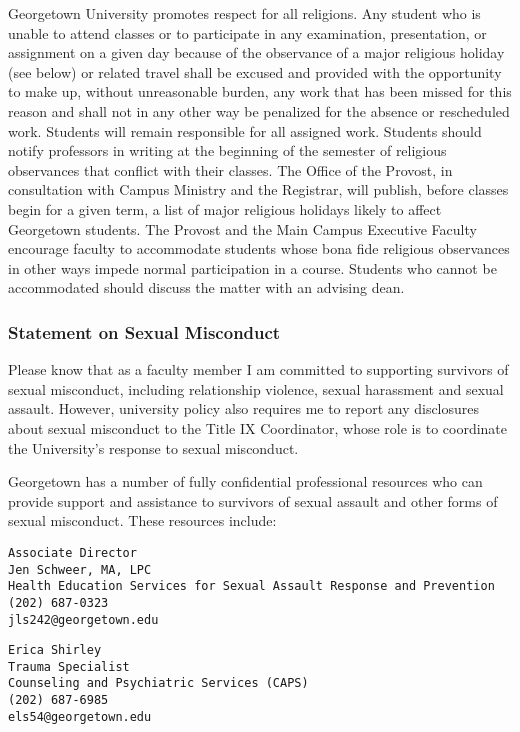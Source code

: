 \documentclass[
  12pt,
]{article}
\begin{document}
Georgetown University promotes respect for all religions. Any student
who is unable to attend classes or to participate in any examination,
presentation, or assignment on a given day because of the observance of
a major religious holiday (see below) or related travel shall be excused
and provided with the opportunity to make up, without unreasonable
burden, any work that has been missed for this reason and shall not in
any other way be penalized for the absence or rescheduled work. Students
will remain responsible for all assigned work. Students should notify
professors in writing at the beginning of the semester of religious
observances that conflict with their classes. The Office of the Provost,
in consultation with Campus Ministry and the Registrar, will publish,
before classes begin for a given term, a list of major religious
holidays likely to affect Georgetown students. The Provost and the Main
Campus Executive Faculty encourage faculty to accommodate students whose
bona fide religious observances in other ways impede normal
participation in a course. Students who cannot be accommodated should
discuss the matter with an advising dean.

\hypertarget{statement-on-sexual-misconduct}{%
\subsubsection{Statement on Sexual
Misconduct}\label{statement-on-sexual-misconduct}}

Please know that as a faculty member I am committed to supporting
survivors of sexual misconduct, including relationship violence, sexual
harassment and sexual assault. However, university policy also requires
me to report any disclosures about sexual misconduct to the Title IX
Coordinator, whose role is to coordinate the University's response to
sexual misconduct.

Georgetown has a number of fully confidential professional resources who
can provide support and assistance to survivors of sexual assault and
other forms of sexual misconduct. These resources include:

\begin{verbatim}
Associate Director
Jen Schweer, MA, LPC
Health Education Services for Sexual Assault Response and Prevention 
(202) 687-0323
jls242@georgetown.edu
\end{verbatim}

\begin{verbatim}
Erica Shirley
Trauma Specialist
Counseling and Psychiatric Services (CAPS) 
(202) 687-6985
els54@georgetown.edu
\end{verbatim}
\end{document}
